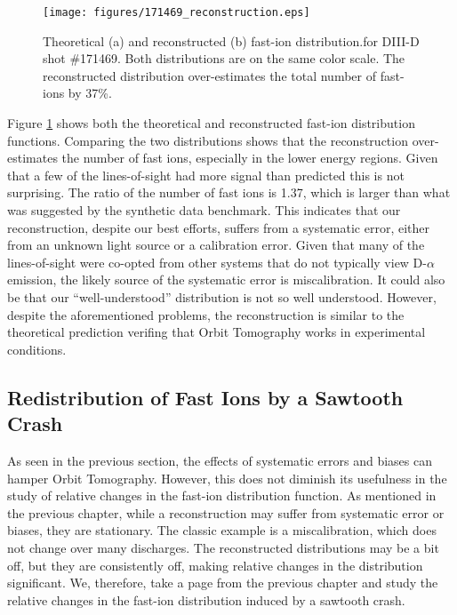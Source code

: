 \begin{figure}[h!]
    \centering
    \texttt{[image: figures/171469\_reconstruction.eps]}
    \caption{Theoretical (a) and reconstructed (b) fast-ion distribution.for DIII-D shot \#171469. Both distributions are on the same color scale. The reconstructed distribution over-estimates the total number of fast-ions by 37\%.}
    \label{fig:d3d_reconstruction}
\end{figure}
Figure \ref{fig:d3d_reconstruction} shows both the theoretical and reconstructed fast-ion distribution functions. Comparing the two distributions shows that the reconstruction over-estimates the number of fast ions, especially in the lower energy regions. Given that a few of the lines-of-sight had more signal than predicted this is not surprising. The ratio of the number of fast ions is 1.37, which is larger than what was suggested by the synthetic data benchmark. This indicates that our reconstruction, despite our best efforts, suffers from a systematic error, either from an unknown light source or a calibration error. Given that many of the lines-of-sight were co-opted from other systems that do not typically view D-$\alpha$ emission, the likely source of the systematic error is miscalibration. It could also be that our ``well-understood'' distribution is not so well understood. However, despite the aforementioned problems, the reconstruction is similar to the theoretical prediction verifing that Orbit Tomography works in experimental conditions. 

\subsection{Redistribution of Fast Ions by a Sawtooth Crash}
As seen in the previous section, the effects of systematic errors and biases can hamper Orbit Tomography. However, this does not diminish its usefulness in the study of relative changes in the fast-ion distribution function. As mentioned in the previous chapter, while a reconstruction may suffer from systematic error or biases, they are stationary. The classic example is a miscalibration, which does not change over many discharges. The reconstructed distributions may be a bit off, but they are consistently off, making relative changes in the distribution significant. We, therefore, take a page from the previous chapter and study the relative changes in the fast-ion distribution induced by a sawtooth crash.

